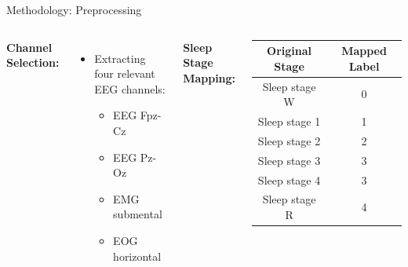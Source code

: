 \begin{frame}{Methodology: Preprocessing}
    \begin{columns}
        \textbf{Channel Selection:}
        \begin{itemize}
            \item Extracting four relevant EEG channels:
            \begin{itemize}
                \item EEG Fpz-Cz
                \item EEG Pz-Oz
                \item EMG submental
                \item EOG horizontal
            \end{itemize}
        \end{itemize}

        \textbf{Sleep Stage Mapping:}
        \begin{table}[]
            \centering
            \renewcommand{\arraystretch}{1.2}
            \begin{tabular}{|c|c|}
                \hline
                \textbf{Original Stage} & \textbf{Mapped Label} \\
                \hline
                Sleep stage W  & 0 \\
                Sleep stage 1  & 1 \\
                Sleep stage 2  & 2 \\
                Sleep stage 3  & 3 \\
                Sleep stage 4  & 3 \\
                Sleep stage R  & 4 \\
                \hline
            \end{tabular}
        \end{table}
    \end{columns}
\end{frame}










